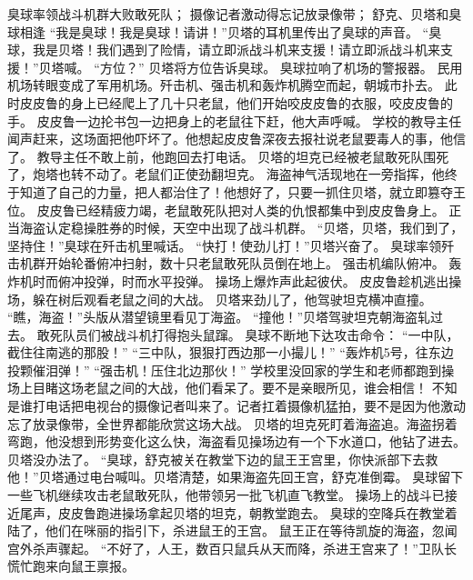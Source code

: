 \documentclass[a4paper,12pt,UTF8,twoside]{ctexbook}
\begin{document}
        臭球率领战斗机群大败敢死队； 
        摄像记者激动得忘记放录像带； 
        舒克、贝塔和臭球相逢   
        “我是臭球！我是臭球！请讲！”贝塔的耳机里传出了臭球的声音。 
        “臭球，我是贝塔！我们遇到了险情，请立即派战斗机来支援！请立即派战斗机来支援！”贝塔喊。 
        “方位？” 
        贝塔将方位告诉臭球。 
        臭球拉响了机场的警报器。 
        民用机场转眼变成了军用机场。歼击机、强击机和轰炸机腾空而起，朝城市扑去。 
        此时皮皮鲁的身上已经爬上了几十只老鼠，他们开始咬皮皮鲁的衣服，咬皮皮鲁的手。 
        皮皮鲁一边抡书包一边把身上的老鼠往下赶，他大声呼喊。 
        学校的教导主任闻声赶来，这场面把他吓坏了。他想起皮皮鲁深夜去报社说老鼠要毒人的事，他信了。 
        教导主任不敢上前，他跑回去打电话。 
        贝塔的坦克已经被老鼠敢死队围死了，炮塔也转不动了。老鼠们正使劲翻坦克。 
        海盗神气活现地在一旁指挥，他终于知道了自己的力量，把人都治住了！他想好了，只要一抓住贝塔，就立即篡夺王位。 
        皮皮鲁已经精疲力竭，老鼠敢死队把对人类的仇恨都集中到皮皮鲁身上。 
        正当海盗认定稳操胜券的时候，天空中出现了战斗机群。 
        “贝塔，贝塔，我们到了，坚持住！”臭球在歼击机里喊话。 
        “快打！使劲儿打！”贝塔兴奋了。 
        臭球率领歼击机群开始轮番俯冲扫射，数十只老鼠敢死队员倒在地上。 
        强击机编队俯冲。 
        轰炸机时而俯冲投弹，时而水平投弹。 
        操场上爆炸声此起彼伏。 
        皮皮鲁趁机逃出操场，躲在树后观看老鼠之间的大战。 
        贝塔来劲儿了，他驾驶坦克横冲直撞。 
        “瞧，海盗！”头版从潜望镜里看见丁海盗。 
        “撞他！”贝塔驾驶坦克朝海盗轧过去。 
        敢死队员们被战斗机打得抱头鼠蹿。 
        臭球不断地下达攻击命令： 
        “一中队，截住往南逃的那股！” 
        “三中队，狠狠打西边那一小撮儿！” 
        “轰炸机5号，往东边投颗催泪弹！” 
        “强击机！压住北边那伙！” 
        学校里没回家的学生和老师都跑到操场上目睹这场老鼠之间的大战，他们看呆了。要不是亲眼所见，谁会相信！ 
        不知是谁打电话把电视台的摄像记者叫来了。记者扛着摄像机猛拍，要不是因为他激动忘了放录像带，全世界都能欣赏这场大战。 
        贝塔的坦克死盯着海盗追。海盗拐着弯跑，他没想到形势变化这么快，海盗看见操场边有一个下水道口，他钻了进去。 
        贝塔没办法了。 
        “臭球，舒克被关在教堂下边的鼠王王宫里，你快派部下去救他！”贝塔通过电台喊叫。贝塔清楚，如果海盗先回王宫，舒克准倒霉。 
        臭球留下一些飞机继续攻击老鼠敢死队，他带领另一批飞机直飞教堂。 
        操场上的战斗已接近尾声，皮皮鲁跑进操场拿起贝塔的坦克，朝教堂跑去。 
        臭球的空降兵在教堂着陆了，他们在咪丽的指引下，杀进鼠王的王宫。 
        鼠王正在等待凯旋的海盗，忽闻宫外杀声骤起。 
        “不好了，人王，数百只鼠兵从天而降，杀进王宫来了！”卫队长慌忙跑来向鼠王禀报。 
\end{document}
